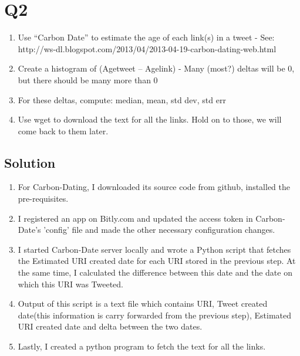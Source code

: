 


\section{Q2}
\label{part2}
\begin{enumerate}

\item Use “Carbon Date” to estimate the age of each link(s) in a tweet
 - See: http://ws-dl.blogspot.com/2013/04/2013-04-19-carbon-dating-web.html 

\item Create a histogram of (Agetweet – Agelink) 
 - Many (most?) deltas will be 0, but there should be many more than 0

\item For these deltas, compute: median, mean, std dev, std err

\item Use wget to download the text for all the links.  Hold on to those, we will come back to them later.

\end{enumerate}

\subsection{Solution}
\begin{enumerate}

\item For Carbon-Dating, I downloaded its source code from github, installed the pre-requisites.

\item I registered an app on Bitly.com and updated the access token in Carbon-Date's 'config' file and made the other necessary configuration changes.

\item I started Carbon-Date server locally and wrote a Python script that fetches the Estimated URI created date for each URI stored in the previous step. At the same time, I calculated the difference between this date and the date on which this URI was Tweeted.

\item Output of this script is a text file which contains URI, Tweet created date(this information is carry forwarded from the previous step), Estimated URI created date and delta between the two dates.
  
\item Lastly, I created a python program to fetch the text for all the links.

\end{enumerate}

